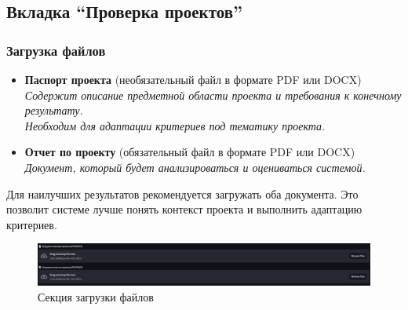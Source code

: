 \documentclass[a4paper,12pt]{article}
\begin{document}
\subsection{Вкладка ``Проверка проектов''}

\begin{samepage}
\subsubsection{Загрузка файлов}
\begin{itemize}
    \item \textbf{Паспорт проекта} (необязательный файл в формате PDF или DOCX)\\
    \textit{Содержит описание предметной области проекта и требования к конечному результату.\\
    Необходим для адаптации критериев под тематику проекта.}
    
    \item \textbf{Отчет по проекту} (обязательный файл в формате PDF или DOCX)\\
    \textit{Документ, который будет анализироваться и оцениваться системой.}
\end{itemize}
\end{samepage}

\begin{tcolorbox}[colback=blue!5!white,colframe=blue!75!black,title=Совет]
Для наилучших результатов рекомендуется загружать оба документа. Это позволит системе лучше понять контекст проекта и выполнить адаптацию критериев.
\end{tcolorbox}

\begin{figure}[!htb]
    \centering
    \includegraphics[width=\linewidth]{assets/upload_files.png}
    \caption{Секция загрузки файлов}
\end{figure}
\end{document}
